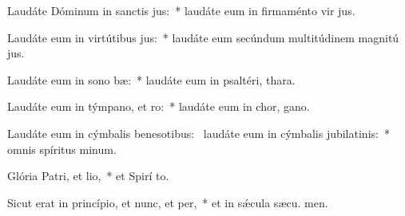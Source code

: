 \item Laudáte Dóminum in sanctis jus:~* laudáte eum in firmaménto vir jus.
\item Laudáte eum in virtútibus jus:~* laudáte eum secúndum multitúdinem magnitú jus.
\item Laudáte eum in sono bæ:~* laudáte eum in psaltéri,  thara.
\item Laudáte eum in týmpano, et ro:~* laudáte eum in chor,  gano.
\item Laudáte eum in cýmbalis benesotibus:~\pscross{} laudáte eum in cýmbalis jubilatinis:~* omnis spíritus  minum.
\item Glória Patri, et lio,~* et Spirí to.
\item Sicut erat in princípio, et nunc, et per,~* et in sǽcula sæcu. men.

